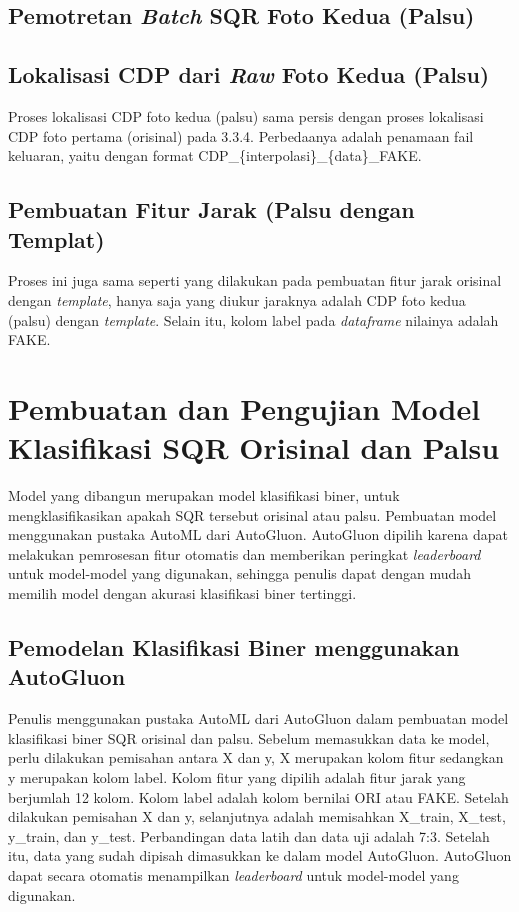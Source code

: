 \subsection{Pemotretan \emph{Batch} SQR Foto Kedua (Palsu)}

\subsection{Lokalisasi CDP dari \emph{Raw} Foto Kedua (Palsu)}
Proses lokalisasi CDP foto kedua (palsu) sama persis dengan proses lokalisasi CDP foto pertama (orisinal) pada 3.3.4. Perbedaanya adalah penamaan fail keluaran, yaitu dengan format CDP\_\{interpolasi\}\_\{data\}\_FAKE.

\subsection{Pembuatan Fitur Jarak (Palsu dengan Templat)}
Proses ini juga sama seperti yang dilakukan pada pembuatan fitur jarak orisinal dengan \emph{template}, hanya saja yang diukur jaraknya adalah CDP foto kedua (palsu) dengan \emph{template}. Selain itu, kolom label pada \emph{dataframe} nilainya adalah FAKE.

\section{Pembuatan dan Pengujian Model Klasifikasi SQR Orisinal dan Palsu}
Model yang dibangun merupakan model klasifikasi biner, untuk mengklasifikasikan apakah SQR tersebut orisinal atau palsu. Pembuatan model menggunakan pustaka AutoML dari AutoGluon. AutoGluon dipilih karena dapat melakukan pemrosesan fitur otomatis dan memberikan peringkat \emph{leaderboard} untuk model-model yang digunakan, sehingga penulis dapat dengan mudah memilih model dengan akurasi klasifikasi biner tertinggi.

\subsection{Pemodelan Klasifikasi Biner menggunakan AutoGluon}
Penulis menggunakan pustaka AutoML dari AutoGluon dalam pembuatan model klasifikasi biner SQR orisinal dan palsu. Sebelum memasukkan data ke model, perlu dilakukan pemisahan antara X dan y, X merupakan kolom fitur sedangkan y merupakan kolom label. Kolom fitur yang dipilih adalah fitur jarak yang berjumlah 12 kolom. Kolom label adalah kolom bernilai ORI atau FAKE. Setelah dilakukan pemisahan X dan y, selanjutnya adalah memisahkan X\_train, X\_test, y\_train, dan y\_test. Perbandingan data latih dan data uji adalah 7:3. Setelah itu, data yang sudah dipisah dimasukkan ke dalam model AutoGluon. AutoGluon dapat secara otomatis menampilkan \emph{leaderboard} untuk model-model yang digunakan.

